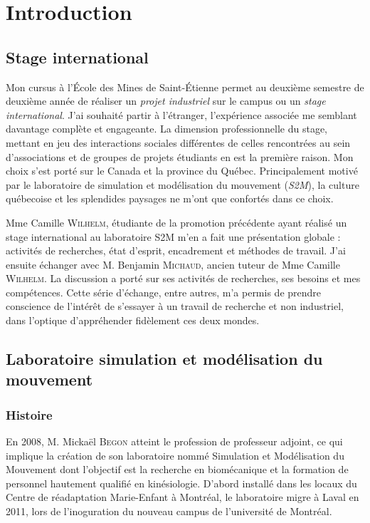 \part{Introduction}
    \chapter{Stage international}

Mon cursus à l'\'Ecole des Mines de Saint-Étienne permet au deuxième semestre de deuxième année de réaliser un \emph{projet industriel} sur le campus ou un \emph{stage international}.
J'ai souhaité partir à l'étranger, l'expérience associée me semblant davantage complète et engageante. La dimension professionnelle du stage, mettant en jeu des interactions sociales différentes de celles rencontrées au sein d'associations et de groupes de projets étudiants en est la première raison. Mon choix s'est porté sur le Canada et la province du Québec. Principalement motivé par le laboratoire de simulation et modélisation du mouvement (\emph{S2M}), la culture québecoise et les splendides paysages ne m'ont que confortés dans ce choix.

Mme Camille \textsc{Wilhelm}, étudiante de la promotion précédente ayant réalisé un stage international au laboratoire S2M m'en a fait une présentation globale : activités de recherches, état d'esprit, encadrement et méthodes de travail. J'ai ensuite échanger avec M. Benjamin \textsc{Michaud}, ancien tuteur de Mme  Camille \textsc{Wilhelm}. La discussion a porté sur ses activités de recherches, ses besoins et mes compétences.
Cette série d'échange, entre autres, m'a permis de prendre conscience de l'intérêt de s'essayer à un travail de recherche et non industriel, dans l'optique d'appréhender fidèlement ces deux mondes.


    \chapter[Laboratoire S2M]{Laboratoire simulation et modélisation du mouvement}
        \section{Histoire}
        
En 2008, M. Mickaël \textsc{Begon} atteint le profession de professeur adjoint, ce qui implique la création de son laboratoire nommé Simulation et Modélisation du Mouvement dont l’objectif est la recherche en biomécanique et la formation de personnel hautement qualifié en kinésiologie. D'abord installé dans les locaux du Centre de réadaptation Marie-Enfant à Montréal, le laboratoire migre à Laval en 2011, lors de l'inoguration du
nouveau campus de l’université de Montréal.


